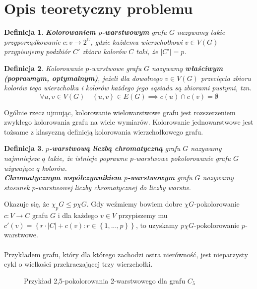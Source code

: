 \documentclass[10pt,a4paper]{article}
\newtheorem{definition}{Definicja}
\begin{document}
	\section{Opis teoretyczny problemu}
	
	\begin{definition}\label{def:1}
		\textbf{Kolorowaniem $p$-warstwowym} grafu $G$ nazywamy takie przyporządkowanie $c: v \rightarrow 2^{C}$, gdzie każdemu wierzchołkowi $v \in V(G)$ przypisujemy podzbiór $C'$ zbioru kolorów $C$ taki, że $|C'| = p$.
	\end{definition}

	\begin{definition}\label{def:2}
		Kolorowanie $p$-warstwowe grafu $G$ nazywamy \textbf{właściwym (poprawnym, optymalnym)}, jeżeli dla dowolnego $v \in V(G)$ przecięcia zbioru kolorów tego wierzchołka i kolorów każdego jego sąsiada są zbiorami pustymi, tzn.
		\[ \forall u, v \in V(G) \quad \left\{u, v\right\} \in E(G) \implies c(u) \cap c(v) = \emptyset \]
	\end{definition}

	Ogólnie rzecz ujmując, kolorowanie wielowarstwowe grafu jest rozszerzeniem zwykłego kolorowania grafu na wiele wymiarów. Kolorowanie jednowarstwowe jest tożsame z klasyczną definicją kolorowania wierzchołkowego grafu.
	
	\begin{definition}
		\textbf{$p$-warstwową liczbą chromatyczną} grafu $G$ nazywamy najmniejsze $q$ takie, że istnieje poprawne $p$-warstwowe pokolorowanie grafu $G$ używające $q$ kolorów.\\
		\textbf{Chromatycznym współczynnikiem $p$-warstwowym} grafu $G$ nazywamy stosunek $p$-warstwowej liczby chromatycznej do liczby warstw.
	\end{definition}

	Okazuje się, że $\chi_{p}G \leq p \chi G$. Gdy weźmiemy bowiem dobre $\chi G$-pokolorowanie $c: V \rightarrow C$ grafu $G$ i dla każdego $v \in V$ przypiszemy mu $c'(v) = \left\{r \cdot |C| + c(v): r \in \left\{1,...,p\right\}\right\}$, to uzyskamy $p \chi G$-pokolorowanie $p$-warstwowe.
	\\~\\
	Przykładem grafu, który dla którego zachodzi ostra nierówność, jest nieparzysty cykl o wielkości przekraczającej trzy wierzchołki. 
	
	\begin{figure}[H]
		\centering
		\caption{Przykład 2,5-pokolorowania 2-warstwowego dla grafu $C_{5}$}
	\end{figure}
	
\end{document}
